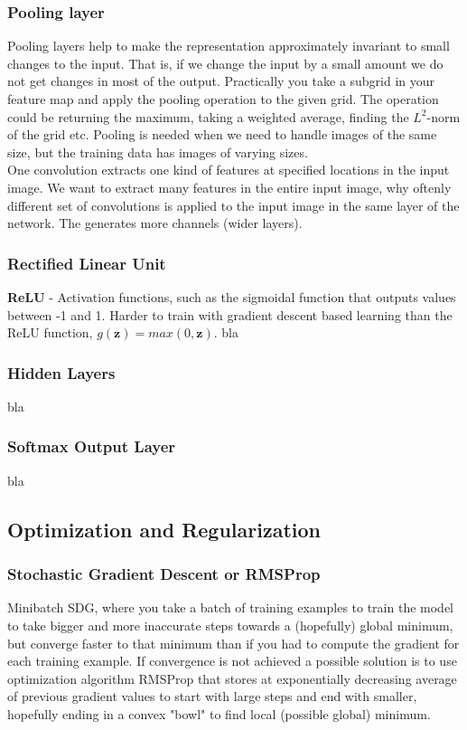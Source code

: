 \documentclass[a4paper,11pt]{article}
\begin{document}
\subsubsection{Pooling layer}
Pooling layers help to make the representation approximately invariant to small changes to the input. That is, if we change the input by a small amount we do not get changes in most of the output. Practically you take a subgrid in your feature map and apply the pooling operation to the given grid. The operation could be returning the maximum, taking a weighted average, finding the $L^2$-norm of the grid etc. Pooling is needed when we need to handle images of the same size, but the training data has images of varying sizes.\\
One convolution extracts one kind of features at specified locations in the input image. We want to extract many features in the entire input image, why oftenly different set of convolutions is applied to the input image in the same layer of the network. The generates more channels (wider layers). \cite{Goodfellow-et-al-2016}
\subsubsection{Rectified Linear Unit}
\textbf{ReLU} - Activation functions, such as the sigmoidal function that outputs values between -1 and 1. Harder to train with gradient descent based learning than the ReLU function, $g(\textbf{z})=max(0,\textbf{z})$.
bla
\subsubsection{Hidden Layers}
bla
\subsubsection{Softmax Output Layer}
bla
\subsection{Optimization and Regularization}
\subsubsection{Stochastic Gradient Descent or RMSProp}
Minibatch SDG, where you take a batch of training examples to train the model to take bigger and more inaccurate steps towards a (hopefully) global minimum, but converge faster to that minimum than if you had to compute the gradient for each training example. If convergence is not achieved a possible solution is to use optimization algorithm RMSProp that stores at exponentially decreasing average of previous gradient values to start with large steps and end with smaller, hopefully ending in a convex "bowl" to find local (possible global) minimum.
\end{document}
